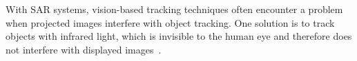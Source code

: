 \documentclass[review]{vgtc}                 %
\begin{document}



With SAR systems, vision-based tracking techniques often encounter a problem when projected images interfere with object tracking. One solution is to track objects with infrared light,
which is invisible to the human eye and therefore does not interfere
with displayed images~\cite{Lee2007,Kinect}.
\end{document}
